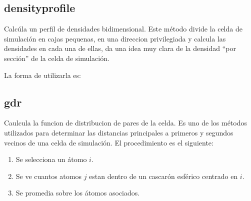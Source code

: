 \subsection{densityprofile}
Calc\'ula un perfil de densidades bidimensional. Este m\'etodo divide la celda
de simulaci\'on en cajas pequenas, en una direccion privilegiada y calcula las
densidades en cada una de ellas, da una idea muy clara de la densidad ``por
secci\'on'' de la celda de simulaci\'on.

La forma de utilizarla es:



\subsection{gdr}
Caulcula la funcion de distribucion de pares de la celda. Es uno de los
m\'etodos utilizados para determinar las distancias principales a primeros y
segundos vecinos de una celda de simulaci\'on. El procedimiento es el siguiente:
\begin{enumerate}
 \item Se selecciona un \'atomo $i$.
 \item Se ve cuantos atomos $j$ estan dentro de un cascar\'on esf\'erico
centrado en $i$.
 \item Se promedia sobre los \'atomos asociados.
\end{enumerate}


